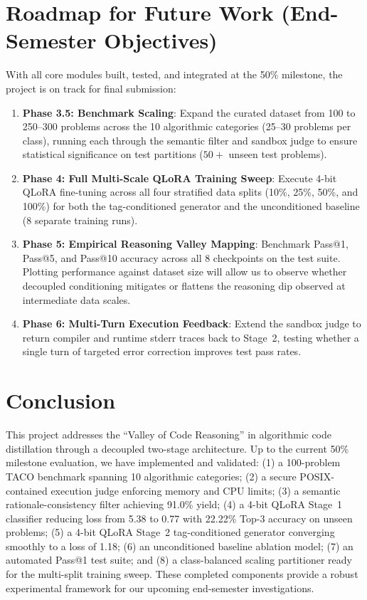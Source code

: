 \documentclass[journal]{IEEEtran}
\begin{document}
\section{Roadmap for Future Work (End-Semester Objectives)}
With all core modules built, tested, and integrated at the 50\% milestone, the project is on track for final submission:
\begin{enumerate}
    \item \textbf{Phase 3.5: Benchmark Scaling}: Expand the curated dataset from 100 to 250--300 problems across the 10 algorithmic categories (25--30 problems per class), running each through the semantic filter and sandbox judge to ensure statistical significance on test partitions ($50+$ unseen test problems).
    \item \textbf{Phase 4: Full Multi-Scale QLoRA Training Sweep}: Execute 4-bit QLoRA fine-tuning across all four stratified data splits (10\%, 25\%, 50\%, and 100\%) for both the tag-conditioned generator and the unconditioned baseline (8 separate training runs).
    \item \textbf{Phase 5: Empirical Reasoning Valley Mapping}: Benchmark Pass@1, Pass@5, and Pass@10 accuracy across all 8 checkpoints on the test suite. Plotting performance against dataset size will allow us to observe whether decoupled conditioning mitigates or flattens the reasoning dip observed at intermediate data scales.
    \item \textbf{Phase 6: Multi-Turn Execution Feedback}: Extend the sandbox judge to return compiler and runtime stderr traces back to Stage~2, testing whether a single turn of targeted error correction improves test pass rates.
\end{enumerate}

\section{Conclusion}
This project addresses the ``Valley of Code Reasoning'' in algorithmic code distillation through a decoupled two-stage architecture. Up to the current 50\% milestone evaluation, we have implemented and validated: (1) a 100-problem TACO benchmark spanning 10 algorithmic categories; (2) a secure POSIX-contained execution judge enforcing memory and CPU limits; (3) a semantic rationale-consistency filter achieving 91.0\% yield; (4) a 4-bit QLoRA Stage~1 classifier reducing loss from 5.38 to 0.77 with 22.22\% Top-3 accuracy on unseen problems; (5) a 4-bit QLoRA Stage~2 tag-conditioned generator converging smoothly to a loss of 1.18; (6) an unconditioned baseline ablation model; (7) an automated Pass@1 test suite; and (8) a class-balanced scaling partitioner ready for the multi-split training sweep. These completed components provide a robust experimental framework for our upcoming end-semester investigations.
\end{document}
